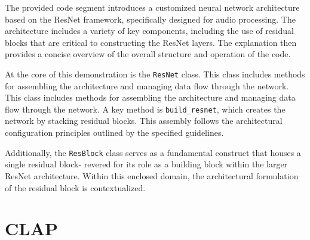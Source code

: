The provided code segment introduces a customized neural network architecture based on the ResNet framework, specifically designed for audio processing. The architecture includes a variety of key components, including the use of residual blocks that are critical to constructing the ResNet layers. The explanation then provides a concise overview of the overall structure and operation of the code. 

At the core of this demonstration is the \texttt{ResNet} class. This class includes methods for assembling the architecture and managing data flow through the network.  This class includes methods for assembling the architecture and managing data flow through the network. A key method is \texttt{build\_resnet}, which creates the network by stacking residual blocks. This assembly follows the architectural configuration principles outlined by the specified guidelines.

Additionally, the \texttt{ResBlock} class serves as a fundamental construct that houses a single residual block- revered for its role as a building block within the larger ResNet architecture. Within this enclosed domain, the architectural formulation of the residual block is contextualized.

\section{CLAP}


